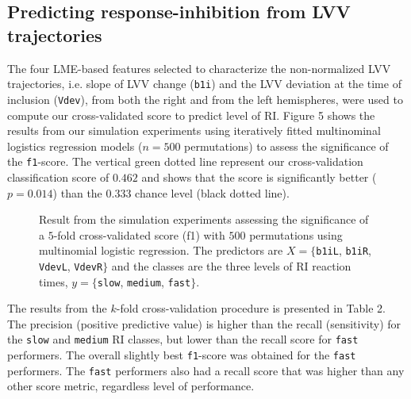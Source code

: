 \documentclass[10pt,letterpaper]{article}
\begin{document}
\subsection{Predicting response-inhibition from LVV trajectories}

The four LME-based features selected to characterize the non-normalized LVV trajectories, i.e. slope of LVV change ({\tt b1i}) and the LVV deviation at the time of inclusion ({\tt Vdev}), from both the right and from the left hemispheres, were used to compute our cross-validated score to predict level of RI. Figure 5 shows the results from our simulation experiments using iteratively fitted multinominal logistics regression models ($n=500$ permutations) to assess the significance of the {\tt f1}-score. The vertical green dotted line represent our cross-validation classification score of $0.462$ and shows that the score is significantly better ($p = 0.014$) than the $0.333$ chance level (black dotted line).

\vspace{3mm}
\begin{figure}[H]
\caption{
Result from the simulation experiments assessing the significance of a $5$-fold cross-validated score (f1) with $500$ permutations using multinomial logistic regression. The predictors
are $X = \{${\tt b1iL}, {\tt b1iR}, {\tt VdevL}, {\tt VdevR}$\}$ and the classes are the three levels of RI reaction times, 
$y = \{${\tt slow}, {\tt medium}, {\tt fast}$\}$. \\}
\label{fig 5}
\end{figure}
\vspace{3mm}


The results from the $k$-fold cross-validation procedure is presented in Table 2. The precision (positive predictive value) is higher than the recall (sensitivity) for the {\tt slow} and {\tt medium} RI classes, but lower than the recall score for {\tt fast} performers. The overall slightly best 
{\tt f1}-score was obtained for the {\tt fast} performers. The {\tt fast} performers also had a recall score that was higher than any other score metric, regardless level of performance.
\end{document}
